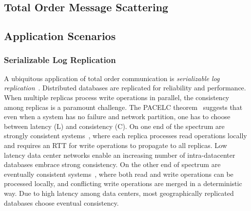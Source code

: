 
\subsection{Total Order Message Scattering}

\subsection{Application Scenarios}

\subsubsection{Serializable Log Replication}
\label{subsec:log-replication}

A ubiquitous application of total order communication is \textit{serializable log replication}~\cite{birman1985replication,petersen1997flexible,belaramani2006practi}.
Distributed databases are replicated for reliability and performance.
When multiple replicas process write operations in parallel, the consistency among replicas is a paramount challenge.
The PACELC theorem~\cite{abadi2012consistency} suggests that even when a system has no failure and network partition, one has to choose between latency (L) and consistency (C).
On one end of the spectrum are strongly consistent systems~\cite{kallman2008h,li2012making,corbett2013spanner}, where each replica processes read operations locally and requires an RTT for write operations to propagate to all replicas.
Low latency data center networks enable an increasing number of intra-datacenter databases embrace strong consistency.
On the other end of spectrum are eventually consistent systems~\cite{terry1995managing,lloyd2011don,lloyd2013stronger}, where both read and write operations can be processed locally, and conflicting write operations are merged in a deterministic way.
Due to high latency among data centers, most geographically replicated databases choose eventual consistency.

